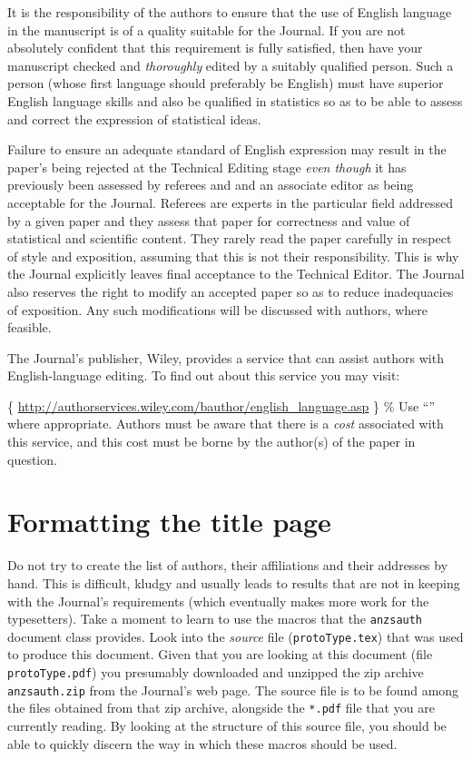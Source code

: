 \documentclass[
  times,
  doublespace]{anzsauth}
\begin{document}
It is the responsibility of the authors to ensure that the use of
English language in the manuscript is of a quality suitable for the
Journal. If you are not absolutely confident that this requirement is
fully satisfied, then have your manuscript checked and \emph{thoroughly}
edited by a suitably qualified person. Such a person (whose first
language should preferably be English) must have superior English
language skills and also be qualified in statistics so as to be able to
assess and correct the expression of statistical ideas.

Failure to ensure an adequate standard of English expression may result
in the paper's being rejected at the Technical Editing stage \emph{even
though} it has previously been assessed by referees and and an associate
editor as being acceptable for the Journal. Referees are experts in the
particular field addressed by a given paper and they assess that paper
for correctness and value of statistical and scientific content. They
rarely read the paper carefully in respect of style and exposition,
assuming that this is not their responsibility. This is why the Journal
explicitly leaves final acceptance to the Technical Editor. The Journal
also reserves the right to modify an accepted paper so as to reduce
inadequacies of exposition. Any such modifications will be discussed
with authors, where feasible.

The Journal's publisher, Wiley, provides a service that can assist
authors with English-language editing. To find out about this service
you may visit:

\{\small
\url{http://authorservices.wiley.com/bauthor/english_language.asp} \} \%
Use ``\noindent'' where appropriate. \noindent Authors must be aware
that there is a \emph{cost} associated with this service, and this cost
must be borne by the author(s) of the paper in question.

\section{Formatting the title page}\label{sec-titPage}

Do not try to create the list of authors, their affiliations and their
addresses by hand. This is difficult, kludgy and usually leads to
results that are not in keeping with the Journal's requirements (which
eventually makes more work for the typesetters). Take a moment to learn
to use the macros that the \texttt{anzsauth} document class provides.
Look into the \emph{source} file (\texttt{protoType.tex}) that was used
to produce this document. Given that you are looking at this document
(file \texttt{protoType.pdf}) you presumably downloaded and unzipped the
zip archive \texttt{anzsauth.zip} from the Journal's web page. The
source file is to be found among the files obtained from that zip
archive, alongside the \texttt{*.pdf} file that you are currently
reading. By looking at the structure of this source file, you should be
able to quickly discern the way in which these macros should be used.
\end{document}
